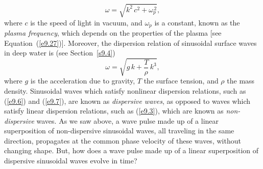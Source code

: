 \begin{equation}\label{e9.6}
\omega = \sqrt{k^2\,c^2 + \omega_p^{\,2}},
\end{equation}
where $c$ is the speed of light in vacuum, and $\omega_p$ is a
constant, known as the {\em plasma frequency}, which depends on the properties of
the plasma [see Equation~(\ref{e9.27})]. Moreover, 
the dispersion relation of sinusoidal surface waves in deep
water is (see Section~\ref{s9.4})
\begin{equation}\label{e9.7}
\omega = \sqrt{g\,k+ \frac{T}{\rho}\,k^3},
\end{equation}
where $g$ is the acceleration due to gravity, $T$ the surface tension, and $\rho$
the mass density. Sinusoidal waves which satisfy nonlinear dispersion relations, such as (\ref{e9.6}) and (\ref{e9.7}), are known
as {\em dispersive waves}, as opposed to waves which satisfy linear
dispersion relations, such as (\ref{e9.3}), which are known as {\em non-dispersive}\/ waves. As we saw above, a wave pulse made up of a linear superposition of non-dispersive sinusoidal waves,
all traveling in the same direction, propagates at the common phase velocity
of these waves, without changing shape. But, how does a wave pulse
made up of a linear superposition of dispersive sinusoidal waves evolve in time?

